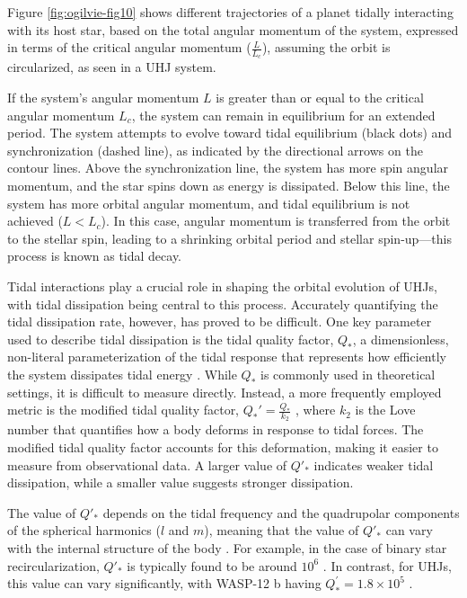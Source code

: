 \documentclass[oneside,12pt]{amsart}
\numberwithin{page}{section}
\begin{document}
Figure \ref{fig:ogilvie-fig10} shows different trajectories of a planet tidally interacting with its host star, based on the total angular momentum of the system, expressed in terms of the critical angular momentum ($\frac{L}{L_c}$), assuming the orbit is circularized, as seen in a UHJ system.

If the system's angular momentum $L$ is greater than or equal to the critical angular momentum $L_c$, the system can remain in equilibrium for an extended period. The system attempts to evolve toward tidal equilibrium (black dots) and synchronization (dashed line), as indicated by the directional arrows on the contour lines. Above the synchronization line, the system has more spin angular momentum, and the star spins down as energy is dissipated. Below this line, the system has more orbital angular momentum, and tidal equilibrium is not achieved ($L < L_c$). In this case, angular momentum is transferred from the orbit to the stellar spin, leading to a shrinking orbital period and stellar spin-up—this process is known as tidal decay.

Tidal interactions play a crucial role in shaping the orbital evolution of UHJs, with tidal dissipation being central to this process. Accurately quantifying the tidal dissipation rate, however, has proved to be difficult. One key parameter used to describe tidal dissipation is the tidal quality factor, $Q_*$, a dimensionless, non-literal parameterization of the tidal response that represents how efficiently the system dissipates tidal energy \citep{ogilvie2014tidal}. While $Q_*$ is commonly used in theoretical settings, it is difficult to measure directly. Instead, a more frequently employed metric is the modified tidal quality factor, $Q_*' = \frac{Q_*}{k_2}$ \citep{patel2022constraining}, where $k_2$ is the Love number that quantifies how a body deforms in response to tidal forces. The modified tidal quality factor accounts for this deformation, making it easier to measure from observational data. A larger value of $Q'_*$ indicates weaker tidal dissipation, while a smaller value suggests stronger dissipation.

The value of $Q'_*$ depends on the tidal frequency and the quadrupolar components of the spherical harmonics ($l$ and $m$), meaning that the value of $Q'_*$ can vary with the internal structure of the body \citep{ogilvie2014tidal}. For example, in the case of binary star recircularization, $Q'_*$ is typically found to be around $10^6$ \citep{ogilvie2007tidal}. In contrast, for UHJs, this value can vary significantly, with WASP-12 b having $Q^{'}_{*} = 1.8 \times 10^5$ \citep{yee2019orbit}.
\end{document}

